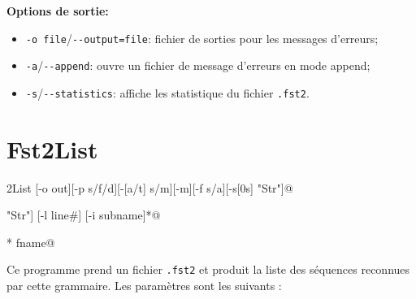 \bigskip
\noindent \textbf{Options de sortie:}
\begin{itemize}
\item \verb+-o file+/\verb+--output=file+: fichier de sorties pour les messages d'erreurs;
\item \verb+-a+/\verb+--append+: ouvre un fichier de message d'erreurs en mode append;
\item \verb+-s+/\verb+--statistics+: affiche les statistique du fichier \verb+.fst2+.
\end{itemize}








\section{Fst2List}
\verb@Fst2List [-o out][-p s/f/d][-[a/t] s/m][-m][-f s/a][-s[0s] "Str"]@

\verb@         [-r[s/l] "Str"] [-l line#] [-i subname]*@

\verb@         [-c SS=0xxxx]* fname@

\bigskip
\noindent Ce programme prend un fichier  \verb+.fst2+ et produit la liste des séquences reconnues par cette grammaire. Les paramètres sont les suivants :


